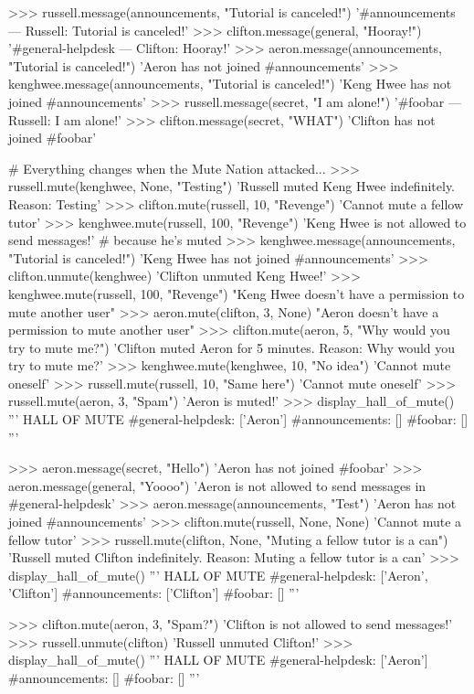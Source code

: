\begin{python}
>>> russell.message(announcements, "Tutorial is canceled!")
'#announcements --- Russell: Tutorial is canceled!'
>>> clifton.message(general, "Hooray!")
'#general-helpdesk --- Clifton: Hooray!'
>>> aeron.message(announcements, "Tutorial is canceled!")
'Aeron has not joined #announcements'
>>> kenghwee.message(announcements, "Tutorial is canceled!")
'Keng Hwee has not joined #announcements'
>>> russell.message(secret, "I am alone!")
'#foobar --- Russell: I am alone!'
>>> clifton.message(secret, "WHAT")
'Clifton has not joined #foobar'
\end{python}

\newpage

\begin{python}
# Everything changes when the Mute Nation attacked...
>>> russell.mute(kenghwee, None, "Testing")
'Russell muted Keng Hwee indefinitely. Reason: Testing'
>>> clifton.mute(russell, 10, "Revenge")
'Cannot mute a fellow tutor'
>>> kenghwee.mute(russell, 100, "Revenge")
'Keng Hwee is not allowed to send messages!' # because he's muted
>>> kenghwee.message(announcements, "Tutorial is canceled!")
'Keng Hwee has not joined #announcements'
>>> clifton.unmute(kenghwee)
'Clifton unmuted Keng Hwee!'
>>> kenghwee.mute(russell, 100, "Revenge")
"Keng Hwee doesn't have a permission to mute another user"
>>> aeron.mute(clifton, 3, None)
"Aeron doesn't have a permission to mute another user"
>>> clifton.mute(aeron, 5, "Why would you try to mute me?")
'Clifton muted Aeron for 5 minutes. Reason: Why would you try to mute me?'
>>> kenghwee.mute(kenghwee, 10, "No idea")
'Cannot mute oneself'
>>> russell.mute(russell, 10, "Same here")
'Cannot mute oneself'
>>> russell.mute(aeron, 3, "Spam")
'Aeron is muted!'
>>> display_hall_of_mute()
'''
HALL OF MUTE
#general-helpdesk: ['Aeron']
#announcements: []
#foobar: []
'''

>>> aeron.message(secret, "Hello")
'Aeron has not joined #foobar'
>>> aeron.message(general, "Yoooo")
'Aeron is not allowed to send messages in #general-helpdesk'
>>> aeron.message(announcements, "Test")
'Aeron has not joined #announcements'
>>> clifton.mute(russell, None, None)
'Cannot mute a fellow tutor'
>>> russell.mute(clifton, None, "Muting a fellow tutor is a can")
'Russell muted Clifton indefinitely. Reason: Muting a fellow tutor is a can'
>>> display_hall_of_mute()
'''
HALL OF MUTE
#general-helpdesk: ['Aeron', 'Clifton']
#announcements: ['Clifton']
#foobar: []
'''


>>> clifton.mute(aeron, 3, "Spam?")
'Clifton is not allowed to send messages!'
>>> russell.unmute(clifton)
'Russell unmuted Clifton!'
>>> display_hall_of_mute()
'''
HALL OF MUTE
#general-helpdesk: ['Aeron']
#announcements: []
#foobar: []
'''


\end{python}
